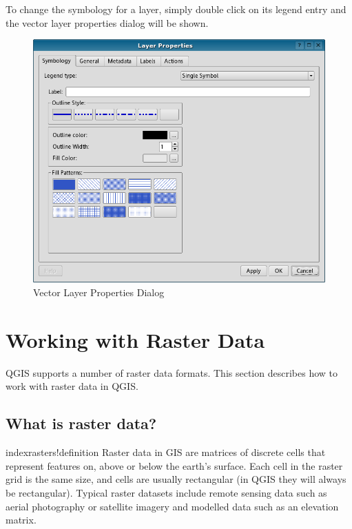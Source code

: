 \documentclass[10pt,english]{article}
\begin{document}
\begin{onehalfspace}
To change the symbology for a layer, simply double click on its legend entry and
the vector layer properties dialog will be shown.

\begin{figure}[h]
   \begin{center}
   \caption{Vector Layer Properties Dialog}\label{fig:vector_symbology}\smallskip
   \includegraphics[scale=.5]{qgis_user_guide_images/vectorLayerSymbology}  
\end{center}  
\end{figure}
\clearpage

\section{Working with Raster Data}
QGIS supports a number of raster data formats. This section describes how to work with raster data in QGIS.
\subsection{What is raster data?}
index{rasters!definition}
Raster data in GIS are matrices of discrete cells that represent features on, above or below the earth's surface. Each cell in the raster grid is the same size, and cells are usually rectangular (in QGIS they will always be rectangular). Typical raster datasets include remote sensing data such as aerial photography or satellite imagery and modelled data such as an elevation matrix.\\


\end{onehalfspace}
\end{document}
